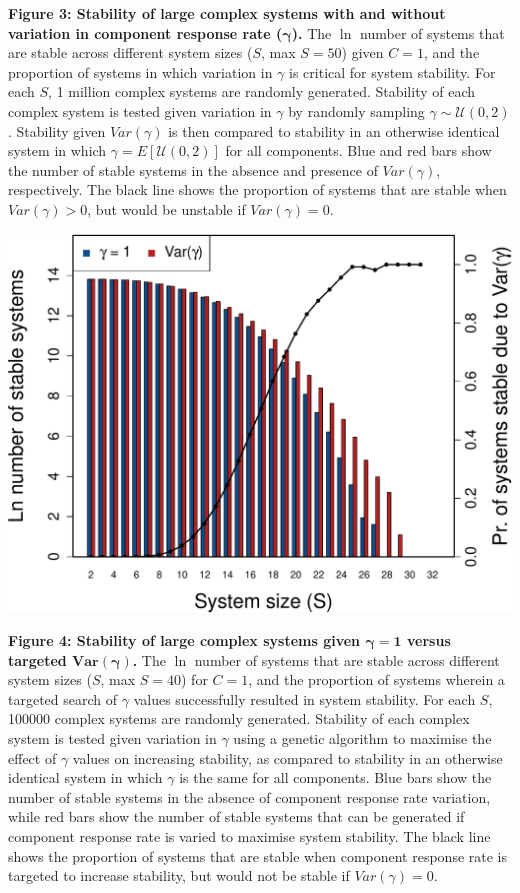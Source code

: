 \documentclass[]{article}
\begin{document}
\clearpage

\textbf{Figure 3: Stability of large complex systems with and without
variation in component response rate (\(\boldsymbol{\gamma}\)).} The
\(\ln\) number of systems that are stable across different system sizes
(\(S\), max \(S=50\)) given \(C = 1\), and the proportion of systems in
which variation in \(\gamma\) is critical for system stability. For each
\(S\), 1 million complex systems are randomly generated. Stability of
each complex system is tested given variation in \(\gamma\) by randomly
sampling \(\gamma \sim \mathcal{U}(0, 2)\). Stability given
\(Var(\gamma)\) is then compared to stability in an otherwise identical
system in which \(\gamma = E[\mathcal{U}(0, 2)]\) for all components.
Blue and red bars show the number of stable systems in the absence and
presence of \(Var(\gamma)\), respectively. The black line shows the
proportion of systems that are stable when \(Var(\gamma) > 0\), but
would be unstable if \(Var(\gamma) = 0\).

\includegraphics{ms_files/figure-latex/unnamed-chunk-15-1.pdf}

\clearpage

\textbf{Figure 4: Stability of large complex systems given
\(\boldsymbol{\gamma = 1}\) versus targeted
\(\boldsymbol{Var(\gamma)}\).} The \(\ln\) number of systems that are
stable across different system sizes (\(S\), max \(S=40\)) for
\(C = 1\), and the proportion of systems wherein a targeted search of
\(\gamma\) values successfully resulted in system stability. For each
\(S\), 100000 complex systems are randomly generated. Stability of each
complex system is tested given variation in \(\gamma\) using a genetic
algorithm to maximise the effect of \(\gamma\) values on increasing
stability, as compared to stability in an otherwise identical system in
which \(\gamma\) is the same for all components. Blue bars show the
number of stable systems in the absence of component response rate
variation, while red bars show the number of stable systems that can be
generated if component response rate is varied to maximise system
stability. The black line shows the proportion of systems that are
stable when component response rate is targeted to increase stability,
but would not be stable if \(Var(\gamma) = 0\).
\end{document}
